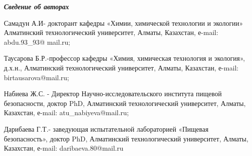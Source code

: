 \emph{{\bfseries Сведение об авторах}}

Самадун А.И- докторант кафедры «Химии, химической технологии и экологии»
Алматинский технологический университет, Алматы, Казахстан, е-mail:
abdu.93\_93@ mail.ru;

Таусарова Б.Р.-профессор кафедры «Химия, химическая технология и
экология», д.х.н., Алматинский технологический университет, Алматы,
Казахстан, е-mail: birtausarova@mail.ru;

Набиева Ж.С. - Директор Научно-исследовательского института пищевой
безопасности, доктор PhD, Алматинский технологический университет,
Алматы, Казахстан, е-mail: atu\_nabiyeva@mail.ru;

Дарибаева Г.Т.- заведующая испытательной лабораторией «Пищевая
безопасность», доктор PhD, Алматинский технологический университет,
Алматы, Казахстан, е-mail: daribaeva.80@mail.ru
